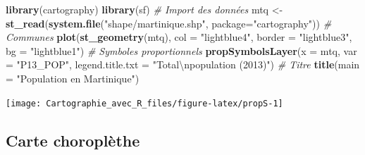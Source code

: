 \documentclass[]{book}
\newenvironment{Shaded}{\begin{snugshade}}{\end{snugshade}}
\newcommand{\CharTok}[1]{\textcolor[rgb]{0.31,0.60,0.02}{#1}}
\newcommand{\CommentTok}[1]{\textcolor[rgb]{0.56,0.35,0.01}{\textit{#1}}}
\newcommand{\DataTypeTok}[1]{\textcolor[rgb]{0.13,0.29,0.53}{#1}}
\newcommand{\DecValTok}[1]{\textcolor[rgb]{0.00,0.00,0.81}{#1}}
\newcommand{\FloatTok}[1]{\textcolor[rgb]{0.00,0.00,0.81}{#1}}
\newcommand{\KeywordTok}[1]{\textcolor[rgb]{0.13,0.29,0.53}{\textbf{#1}}}
\newcommand{\NormalTok}[1]{#1}
\newcommand{\OperatorTok}[1]{\textcolor[rgb]{0.81,0.36,0.00}{\textbf{#1}}}
\newcommand{\StringTok}[1]{\textcolor[rgb]{0.31,0.60,0.02}{#1}}
\begin{document}
\begin{Shaded}
\begin{Highlighting}[]
\KeywordTok{library}\NormalTok{(cartography)}
\KeywordTok{library}\NormalTok{(sf)}
\CommentTok{# Import des données}
\NormalTok{mtq <-}\StringTok{ }\KeywordTok{st_read}\NormalTok{(}\KeywordTok{system.file}\NormalTok{(}\StringTok{"shape/martinique.shp"}\NormalTok{, }\DataTypeTok{package=}\StringTok{"cartography"}\NormalTok{))}
\CommentTok{# Communes}
\KeywordTok{plot}\NormalTok{(}\KeywordTok{st_geometry}\NormalTok{(mtq), }\DataTypeTok{col =} \StringTok{"lightblue4"}\NormalTok{, }\DataTypeTok{border =} \StringTok{"lightblue3"}\NormalTok{, }
     \DataTypeTok{bg =} \StringTok{"lightblue1"}\NormalTok{)}
\CommentTok{# Symboles proportionnels}
\KeywordTok{propSymbolsLayer}\NormalTok{(}\DataTypeTok{x =}\NormalTok{ mtq, }\DataTypeTok{var =} \StringTok{"P13_POP"}\NormalTok{, }
                 \DataTypeTok{legend.title.txt =} \StringTok{"Total}\CharTok{\textbackslash{}n}\StringTok{population (2013)"}\NormalTok{)}
\CommentTok{# Titre}
\KeywordTok{title}\NormalTok{(}\DataTypeTok{main =} \StringTok{"Population en Martinique"}\NormalTok{)}
\end{Highlighting}
\end{Shaded}

\begin{center}\texttt{[image: Cartographie\_avec\_R\_files/figure-latex/propS-1]} \end{center}

\hypertarget{carte-choroplethe}{%
\subsection{Carte choroplèthe}\label{carte-choroplethe}}

\begin{Shaded}
\end{Shaded}
\end{document}
